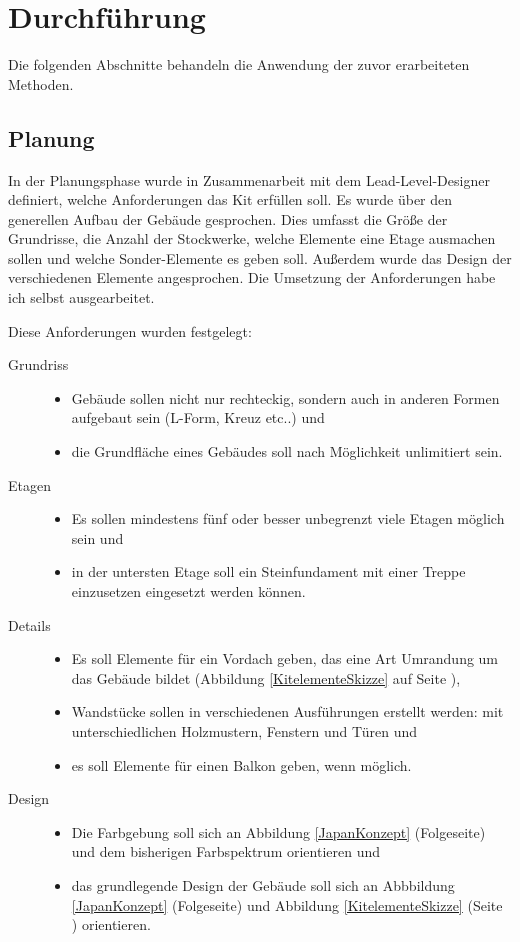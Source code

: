 \section{Durchführung}
Die folgenden Abschnitte behandeln die Anwendung der zuvor erarbeiteten Methoden.
\subsection{Planung}
In der Planungsphase wurde in Zusammenarbeit mit dem Lead-Level-Designer definiert, welche Anforderungen das Kit erfüllen soll. Es wurde über den generellen Aufbau der Gebäude gesprochen. Dies umfasst die Größe der Grundrisse, die Anzahl der Stockwerke, welche Elemente eine Etage ausmachen sollen und welche Sonder-Elemente es geben soll. Außerdem wurde das Design der verschiedenen Elemente angesprochen. Die Umsetzung der Anforderungen habe ich selbst ausgearbeitet.
\par
Diese Anforderungen wurden festgelegt:
\begin{description}
\item[Grundriss]\hfill
\begin{itemize}[leftmargin=0cm]
\item Gebäude sollen nicht nur rechteckig, sondern auch in anderen Formen aufgebaut sein (L-Form, Kreuz etc..) und
\item die Grundfläche eines Gebäudes soll nach Möglichkeit unlimitiert sein.
\end{itemize}
\item[Etagen]\hfill
\begin{itemize}[leftmargin=0cm]
\item Es sollen mindestens fünf oder besser unbegrenzt viele Etagen möglich sein und
\item in der untersten Etage soll ein Steinfundament mit einer Treppe einzusetzen eingesetzt werden können.
\end{itemize}
\item[Details]\hfill
\begin{itemize}[leftmargin=0cm]
\item Es soll Elemente für ein Vordach geben, das eine Art Umrandung um das Gebäude bildet (Abbildung \ref{KitelementeSkizze} auf Seite \pageref{KitelementeSkizze} ),
\item Wandstücke sollen in verschiedenen Ausführungen erstellt werden: mit unterschiedlichen Holzmustern, Fenstern und Türen und
\item es soll Elemente für einen Balkon geben, wenn möglich.
\end{itemize}
\item[Design]\hfill
\begin{itemize}[leftmargin=0cm]
\item Die Farbgebung soll sich an Abbildung \ref{JapanKonzept} (Folgeseite) und dem bisherigen Farbspektrum orientieren und
\item das grundlegende Design der Gebäude soll sich an Abbbildung \ref{JapanKonzept} (Folgeseite) und Abbildung \ref{KitelementeSkizze} (Seite \pageref{KitelementeSkizze}) orientieren.
\end{itemize}
\end{description}
